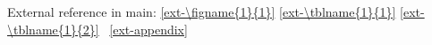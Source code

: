 \documentclass[12pt, lettersize]{article}
\begin{document}

\newpage



\newpage







External reference in main:
\ref{ext-\figname{1}{1}}
\ref{ext-\tblname{1}{1}}
\ref{ext-\tblname{1}{2}}
\APPENDIX~\ref{ext-appendix}

\newpage
\printbibliography

\newpage
\appendix


\end{document}
